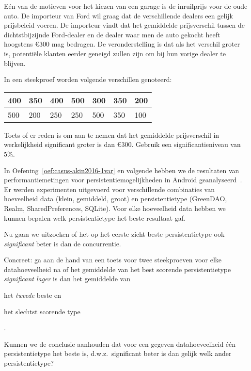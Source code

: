 \begin{exercise}
  \label{oef:prijsverschil-autos}
  
  Eén van de motieven voor het kiezen van een garage is de inruilprijs voor de oude auto. De importeur van Ford wil graag dat de verschillende dealers een gelijk prijsbeleid voeren. De importeur vindt dat het gemiddelde prijsverschil tussen de dichtstbijzijnde Ford-dealer en de dealer waar men de auto gekocht heeft hoogstens \euro{300} mag bedragen. De veronderstelling is dat als het verschil groter is, potentiële klanten eerder geneigd zullen zijn om bij hun vorige dealer te blijven.
  
  In een steekproef worden volgende verschillen genoteerd:
  
  \begin{center}
    \begin{tabular}{|l|l|l|l|l|l|l|}
      \hline
      400 & 350 & 400 & 500 & 300 & 350 & 200 \\ \hline
      500 & 200 & 250 & 250 & 500 & 350 & 100 \\ \hline
    \end{tabular}
  \end{center}

  Toets of er reden is om aan te nemen dat het gemiddelde prijsverschil in werkelijkheid significant groter is dan \euro{300}. Gebruik een significantieniveau van 5\%. 
  
\end{exercise}

\begin{exercise}
  \label{oef:casus-akin2016-toets}
  
  In Oefening~\ref{oef:casus-akin2016-1var} en volgende hebben we de resultaten van performantiemetingen voor persistentiemogelijkheden in Android geanalyseerd~\autocite{Akin2016}. Er werden experimenten uitgevoerd voor verschillende combinaties van hoeveelheid data (klein, gemiddeld, groot) en persistentietype (GreenDAO, Realm, SharedPreferences, SQLite). Voor elke hoeveelheid data hebben we kunnen bepalen welk persistentietype het beste resultaat gaf.
  
  Nu gaan we uitzoeken of het op het eerste zicht beste persistentietype ook \emph{significant} beter is dan de concurrentie.
  
  Concreet: ga aan de hand van een toets voor twee steekproeven voor elke datahoeveelheid na of het gemiddelde van het best scorende persistentietype \emph{significant lager} is dan het gemiddelde van \begin{inparaenum}[(i)] \item het \emph{tweede} beste en \item het slechtst scorende type \end{inparaenum}.
  
  Kunnen we de conclusie aanhouden dat voor een gegeven datahoeveelheid één persistentietype het beste is, d.w.z.~significant beter is dan gelijk welk ander persistentietype?
\end{exercise}

